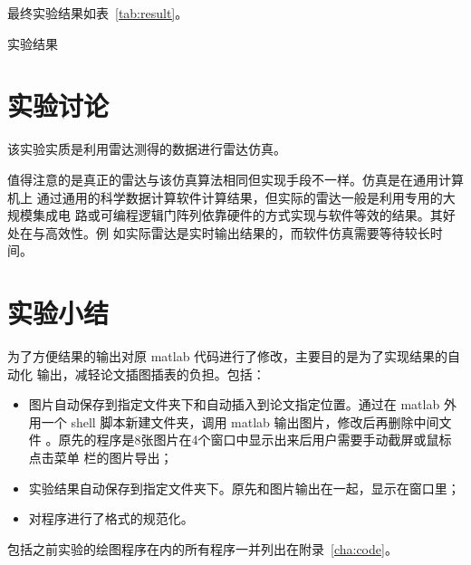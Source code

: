 \documentclass[../main]{subfiles}
\begin{document}
最终实验结果如表~\ref{tab:result}。

\begin{table}[htbp]
  \centering
  \caption{实验结果}%
  \label{tab:result}
\end{table}

\section{实验讨论}%
\label{sec:\arabic{chapter}discuss}

该实验实质是利用雷达测得的数据进行雷达仿真。

值得注意的是真正的雷达与该仿真算法相同但实现手段不一样。仿真是在通用计算机上
通过通用的科学数据计算软件计算结果，但实际的雷达一般是利用专用的大规模集成电
路或可编程逻辑门阵列依靠硬件的方式实现与软件等效的结果。其好处在与高效性。例
如实际雷达是实时输出结果的，而软件仿真需要等待较长时间。

\section{实验小结}%
\label{sec:\arabic{chapter}conclusion}

为了方便结果的输出对原 matlab 代码进行了修改，主要目的是为了实现结果的自动化
输出，减轻论文插图插表的负担。包括：

\begin{itemize}
  \item 图片自动保存到指定文件夹下和自动插入到论文指定位置。通过在 matlab
    外用一个 shell 脚本新建文件夹，调用 matlab 输出图片，修改后再删除中间文件
    。原先的程序是8张图片在4个窗口中显示出来后用户需要手动截屏或鼠标点击菜单
    栏的图片导出；
  \item 实验结果自动保存到指定文件夹下。原先和图片输出在一起，显示在窗口里；
  \item 对程序进行了格式的规范化。
\end{itemize}

包括之前实验的绘图程序在内的所有程序一并列出在附录~\ref{cha:code}。
\end{document}
